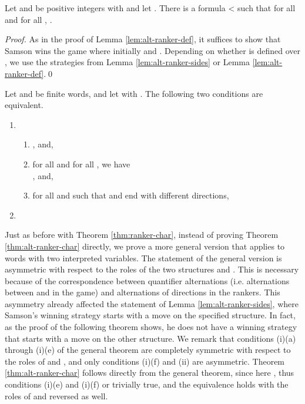 \documentclass{LMCS}
\newcommand{\qedconf}{}
\renewcommand{\qedconf}{\qed}
\begin{document}
\begin{full}
\begin{lem} \label{lem:alt-ranker-exp} Let  and  be positive
  integers with  and let . There is a formula
  < such that for all 
  and for all , .
\end{lem}

\begin{proof}
  As in the proof of Lemma \ref{lem:alt-ranker-def}, it suffices to show
  that Samson wins the game
   where initially 
   and . Depending on
  whether  is defined over , we use the strategies from Lemma
  \ref{lem:alt-ranker-sides} or Lemma \ref{lem:alt-ranker-def}.\qedconf
\end{proof}
\end{full}


\begin{thm}
  \label{thm:alt-ranker-char}
  Let  and  be finite words, and let  with . The
  following two conditions are equivalent.
  \begin{enumerate}[\em(i)]
  \item
    \begin{enumerate}[\em(a)]
    \item , and,
    \item for all  and for all , we have\\
      , and,
    \item for all  and 
      such that  and  end with different directions,
      
    \end{enumerate}
  \item 
  \end{enumerate}
\end{thm}

Just as before with Theorem \ref{thm:ranker-char}, instead of proving
Theorem \ref{thm:alt-ranker-char} directly, we prove a more general version
that applies to words with two interpreted variables. The statement of the
general version is asymmetric with respect to the roles of the two
structures  and . This is necessary because of the correspondence
between quantifier alternations (i.e. alternations between  and  in
the game) and alternations of directions in the rankers. This asymmetry
already affected the statement of Lemma \ref{lem:alt-ranker-sides}, where
Samson's winning strategy starts with a move on the specified structure. In
fact, as the proof of the following theorem shows, he does not have a
winning strategy that starts with a move on the other structure. We remark
that conditions (i)(a) through (i)(e) of the general theorem are completely
symmetric with respect to the roles of  and , and only conditions
(i)(f) and (ii) are asymmetric. Theorem \ref{thm:alt-ranker-char} follows
directly from the general theorem, since here ,
thus conditions (i)(e) and (i)(f) or trivially true, and the equivalence
holds with the roles of  and  reversed as well.
\pagebreak[4]
\end{document}

